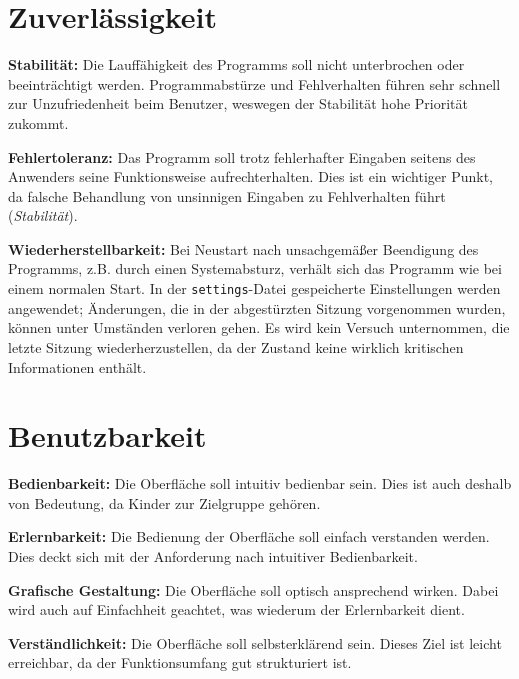 \documentclass[10pt]{scrreprt}
\newcommand{\sfbf}[1]{\textbf{\sffamily #1}}
\newcommand{\textref}[1]{\mbox{\raisebox{0.1ex}{\small$\rightarrow$ }\textit{#1}}}
\newenvironment{details}[1][6pt]{%
  \parskip#1 \parindent6mm \raggedright%
  \def\item{\par\ignorespaces\hangindent=5mm \hangafter1}}{%
  \par\ignorespaces}
\begin{document}
\section*{Zuverlässigkeit}
\begin{details}
\item \sfbf{Stabilität:} Die Lauffähigkeit des Programms soll nicht unterbrochen oder beeinträchtigt werden. Programmabstürze und Fehlverhalten führen sehr schnell zur Unzufriedenheit beim Benutzer, weswegen der Stabilität hohe Priorität zukommt.

\item \sfbf{Fehlertoleranz:} Das Programm soll trotz fehlerhafter Eingaben seitens des Anwenders seine Funktionsweise aufrechterhalten. Dies ist ein wichtiger Punkt, da falsche Behandlung von unsinnigen Eingaben zu Fehlverhalten führt (\textref{Stabilität}).

\item \sfbf{Wiederherstellbarkeit:} Bei Neustart nach unsachgemäßer Beendigung des Programms, z.B. durch einen Systemabsturz, verhält sich das Programm wie bei einem normalen Start. In der \texttt{settings}-Datei gespeicherte Einstellungen werden angewendet; Änderungen, die in der abgestürzten Sitzung vorgenommen wurden, können unter Umständen verloren gehen. Es wird kein Versuch unternommen, die letzte Sitzung wiederherzustellen, da der Zustand keine wirklich kritischen Informationen enthält.
\end{details}


\section*{Benutzbarkeit}
\begin{details}
\item \sfbf{Bedienbarkeit:} Die Oberfläche soll intuitiv bedienbar sein. Dies ist auch deshalb von Bedeutung, da Kinder zur Zielgruppe gehören.

\item \sfbf{Erlernbarkeit:} Die Bedienung der Oberfläche soll einfach verstanden werden. Dies deckt sich mit der Anforderung nach intuitiver Bedienbarkeit.

\item \sfbf{Grafische Gestaltung:} Die Oberfläche soll optisch ansprechend wirken. Dabei wird auch auf Einfachheit geachtet, was wiederum der Erlernbarkeit dient.

\item \sfbf{Verständlichkeit:} Die Oberfläche soll selbsterklärend sein. Dieses Ziel ist leicht erreichbar, da der Funktionsumfang gut strukturiert ist.
\end{details}
\end{document}
